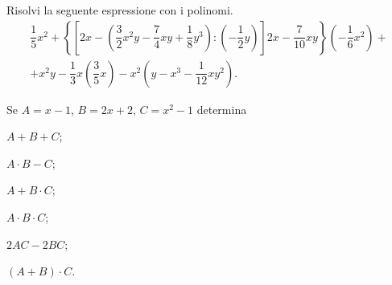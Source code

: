 \begin{esercizio}[\Ast]
Risolvi la seguente espressione con i polinomi.
\begin{multline*}
\dfrac{1}{5}x^{2}+\left\{\left[2x-\left(\dfrac{3}{2}x^{2}y-\dfrac{7}{4}xy+\dfrac{1}{8}y^{3}\right):\left(-{\dfrac{1}{2}y}\right)\right] 2x-\dfrac{7}{10}xy\right\}\left(-{\dfrac{1}{6}x^{2}}\right)+\\
+x^{2}y-\dfrac{1}{3}x\left(\dfrac{3}{5}x\right)-x^{2}\left(y-x^{3}-\dfrac{1}{12}xy^{2}\right).
\end{multline*}
\end{esercizio}
\newpage
\begin{esercizio}
Se $A=x-1$, $B=2x+2$, $C=x^2-1$ determina
\begin{multicols}{3}
\begin{enumeratea}
\item $A+B+C$;
\item $A\cdot B-C$;
\item $A+B\cdot C$;
\item $A\cdot B\cdot C$;
\item $2AC-2BC$;
\item $(A+B)\cdot C$.
\end{enumeratea}
\end{multicols}
\end{esercizio}

